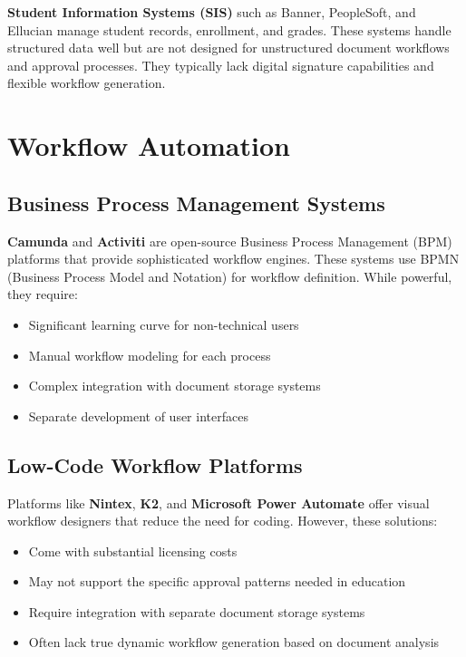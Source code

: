 \textbf{Student Information Systems (SIS)} such as Banner, PeopleSoft, and Ellucian manage student records, enrollment, and grades. These systems handle structured data well but are not designed for unstructured document workflows and approval processes. They typically lack digital signature capabilities and flexible workflow generation.

\section{Workflow Automation}

\subsection{Business Process Management Systems}

\textbf{Camunda} and \textbf{Activiti} are open-source Business Process Management (BPM) platforms that provide sophisticated workflow engines. These systems use BPMN (Business Process Model and Notation) for workflow definition. While powerful, they require:
\begin{itemize}
\item Significant learning curve for non-technical users
\item Manual workflow modeling for each process
\item Complex integration with document storage systems
\item Separate development of user interfaces
\end{itemize}

\subsection{Low-Code Workflow Platforms}

Platforms like \textbf{Nintex}, \textbf{K2}, and \textbf{Microsoft Power Automate} offer visual workflow designers that reduce the need for coding. However, these solutions:
\begin{itemize}
\item Come with substantial licensing costs
\item May not support the specific approval patterns needed in education
\item Require integration with separate document storage systems
\item Often lack true dynamic workflow generation based on document analysis
\end{itemize}

